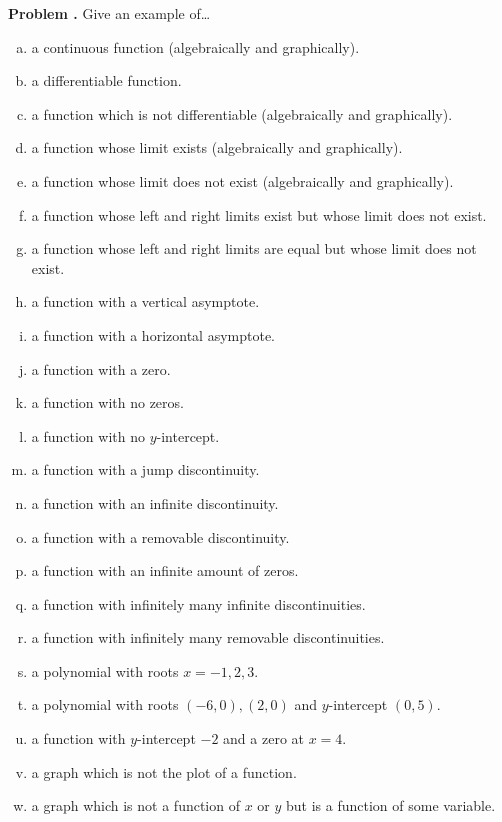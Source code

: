 \documentclass[11pt,letterpaper]{article}
\newcounter{problem}
\newcommand{\prob}{\stepcounter{problem}%
\noindent\textbf{Problem \theproblem. }}
\begin{document}
\prob Give an example of\dots
        \begin{enumerate}[(a)]
        \item a continuous function (algebraically and graphically).
        \item a differentiable function.
        \item a function which is not differentiable (algebraically and graphically).
        \item a function whose limit exists (algebraically and graphically).
        \item a function whose limit does not exist (algebraically and graphically).
        \item a function whose left and right limits exist but whose limit does not exist.
        \item a function whose left and right limits are equal but whose limit does not exist.
        \item a function with a vertical asymptote.
        \item a function with a horizontal asymptote.
        \item a function with a zero.
        \item a function with no zeros.
        \item a function with no $y$-intercept.
        \item a function with a jump discontinuity.
        \item a function with an infinite discontinuity.
        \item a function with a removable discontinuity. 
        \item a function with an infinite amount of zeros.
        \item a function with infinitely many infinite discontinuities.
        \item a function with infinitely many removable discontinuities.
        \item a polynomial with roots $x= -1,2,3$.
        \item a polynomial with roots $(-6,0),(2,0)$ and $y$-intercept $(0,5)$.
        \item a function with $y$-intercept $-2$ and a zero at $x=4$.
        \item a graph which is not the plot of a function.
        \item a graph which is not a function of $x$ or $y$ but is a function of some variable. \\
        \end{enumerate}
\end{document}
